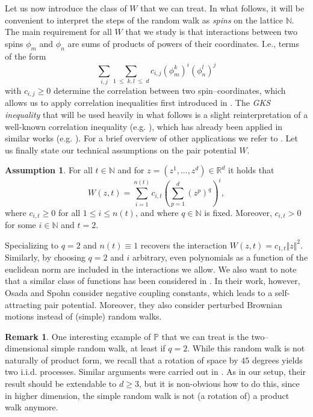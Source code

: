 \documentclass[reqno,11pt]{amsart}
\newcommand{\1}{\mathds{1}}
\theoremstyle{plain}
\theoremstyle{definition}
\newtheorem{remark}[theorem]{Remark}
\newtheorem{assumption}[theorem]{Assumption}
\numberwithin{equation}{section}
\renewcommand{\leq}{\;\leqslant\;}
\newcommand{\bbN}{{\mathbb N}}
\newcommand{\bbP}{{\mathbb P}}
\newcommand{\bbR}{{\mathbb R}}
\def\lt{\left}
\def\rt{\right}
\begin{document}
Let us now introduce the class of $W$ that we can treat. In what follows, it will be convenient to interpret the steps of the random walk as \textit{spins} on the lattice $\bbN$. The main requirement for all $W$ that we study is that interactions between two spins $\phi_m$ and $\phi_n$ are sums of products of powers of their coordinates. I.e., terms of the form 
\[
\sum_{i,j} \sum\limits_{1\leq k,l \leq d} c_{i,j} (\phi_m ^k)^i (\phi_n ^l)^j
\]
with $c_{i,j} \ge 0$ determine the correlation between two spin--coordinates, which allows us to apply correlation inequalities first introduced in \cite{gi70}. The \textit{GKS inequality} that will be used heavily in what follows is a slight reinterpretation of a well-known correlation inequality (e.g. \cite[Theorem 12.1]{simon79}), which has already been applied in similar works (e.g. \cite{OsSp99}). For a brief overview of other applications we refer to \cite[Chapter 12]{simon79}. Let us finally state our technical assumptions on the pair potential $W$.

\begin{assumption}
    \label{ass:short_range}
    For all $t \in \bbN$
    and for $z= (z^1,...,z^d) \in \bbR^d$ 
    it holds that
    $$W(z,t) = \sum\limits_{i=1} ^{n(t)} c_{i,t} \lt( \sum\limits_{p=1} ^d (z^p) ^q \rt)^i,$$
    where $c_{i,t} \ge 0$ for all $1 \le i \le n(t)$, and where $q \in \bbN$ is fixed.
    Moreover, $c_{i,t} > 0$ for some $i \in \bbN$ and $t = 2$.
\end{assumption}
Specializing to $q=2$ and $n(t) \equiv 1$ recovers the interaction
$W(z,t) = c_{1,t} \Vert z \Vert ^2$. Similarly, by choosing $q=2$ and $i$ arbitrary, even polynomials as a function of the euclidean norm are included in the interactions we allow. 
We also want to note that a similar class of functions has been considered in \cite{OsSp99}. In their work, however, Osada and Spohn consider negative coupling constants, which leads to a self-attracting pair potential. Moreover, they also consider perturbed Brownian motions instead of (simple) random walks. 

\begin{remark}
    One interesting example of $\bbP$ that we can treat is the two--dimensional simple random walk, at least if $q=2$. While this random walk is not naturally of product form, we recall that a rotation of space by $45$ degrees yields two i.i.d. processes. 
    Similar arguments were carried out in \cite{PrSaSc08}. As in our setup, their result should be extendable to $d \ge 3$, but it is non-obvious how to do this, since in higher dimension, the simple random walk is not (a rotation of) a product walk anymore.
\end{remark}
\end{document}
